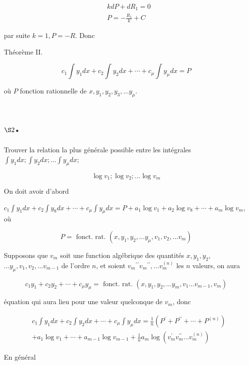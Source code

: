 \documentclass{article}
\begin{document}
\[
\begin{aligned}
& k d P+d R_{1}=0 \\
& P=-\frac{R_{1}}{k}+C
\end{aligned}
\]

par suite \(k=1, P=-R\). Donc

Théorème II.

\[
c_{1} \int y_{1} d x+c_{2} \int y_{2} d x+\cdots+c_{\mu} \int y_{\mu} d x=P
\]

où \(P\) fonction rationnelle de \(x, y_{1}, y_{2}, y_{3}, \ldots y_{\mu}\).

\section*{\(\S 2\).}

Trouver la relation la plus générale possible entre les intégrales \(\int y_{1} d x ; \int y_{2} d x ; \ldots \int y_{\mu} d x\);

\[
\log v_{1} ; \log v_{2} ; \ldots \log v_{m}
\]

On doit avoir d'abord

\(c_{1} \int y_{1} d x+c_{2} \int y_{8} d x+\cdots+c_{\mu} \int y_{\mu} d x=P+a_{1} \log v_{1}+a_{2} \log v_{8}+\cdots+a_{m} \log v_{m}\), où

\[
P=\text { fonct. rat. }\left(x, y_{1}, y_{2}, \ldots y_{\mu}, v_{1}, v_{2}, \ldots v_{m}\right)
\]

Supposons que \(v_{m}\) soit une function algébrique des quantités \(x, y_{1}, y_{2}\), \(\ldots y_{\mu}, v_{1}, v_{2}, \ldots v_{m-1}\) de l'ordre \(n\), et soient \(v_{m}{ }^{\prime}{ }^{\prime} v_{m}{ }^{\prime \prime}, \ldots v_{m}^{(n)}\) les \(n\) valeurs, on aura

\[
c_{1} y_{1}+c_{2} y_{2}+\cdots+c_{\mu} y_{\mu}=\text { fonct. rat. }\left(x, y_{1}, y_{2}, \ldots y_{m}, v_{1} \ldots v_{m-1}, v_{m}\right)
\]

équation qui aura lieu pour une valeur quelconque de \(v_{m}\), donc

\[
\begin{aligned}
& c_{1} \int y_{1} d x+c_{2} \int y_{2} d x+\cdots+c_{\mu} \int y_{\mu} d x=\frac{1}{n}\left(P^{\prime}+P^{\prime \prime}+\cdots+P^{(n)}\right) \\
&+a_{1} \log v_{1}+\cdots+a_{m-1} \log v_{m-1}+\frac{1}{n} a_{m} \log \left(v_{m}^{\prime} v_{m}^{\prime \prime} \ldots v_{m}^{(n)}\right)
\end{aligned}
\]

En général
\end{document}
